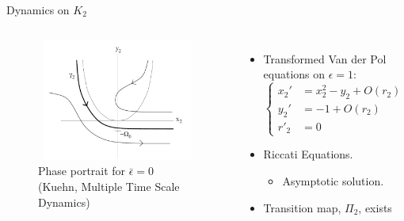 \documentclass[11pt]{beamer}
\begin{document}
\begin{frame}{Dynamics on $K_2$}
\begin{columns}
\begin{figure}
\centering
\includegraphics[height=4cm,width=6cm]{Dynamics_in_K2.png}
\caption{Phase portrait for $\bar{\epsilon}=0$ (Kuehn, Multiple Time Scale Dynamics)}

\end{figure}
\begin{itemize}
\item Transformed Van der Pol equations on $ \epsilon=1$:
\begin{equation*}
\begin{cases}
x_2' &= x_2^2-y_2+O(r_2)\\
y_2' &= -1+O(r_2)\\
r'_2&=0
\end{cases}
\end{equation*}
\item Riccati Equations.
\begin{itemize}
	\item Asymptotic solution.
\end{itemize}
\item Transition map, $\Pi_2$, exists

\end{itemize}
\end{columns}
\end{frame}
\end{document}
